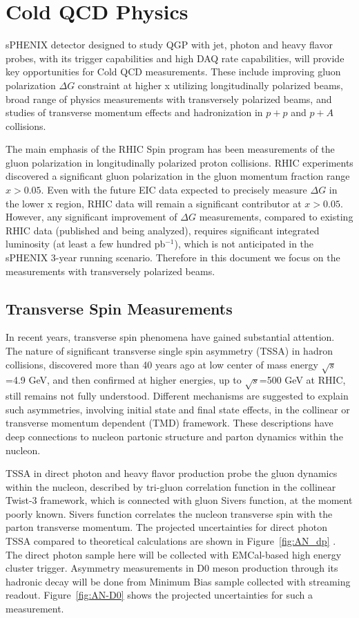 \section{Cold QCD Physics}
\label{sec:ColdQCD}

sPHENIX detector designed to study QGP with jet, photon and heavy flavor probes, with its trigger capabilities and high DAQ rate capabilities, will provide key opportunities for Cold QCD measurements. These include improving gluon polarization $\Delta G$ constraint at higher x utilizing longitudinally polarized beams, broad range of physics measurements with transversely polarized beams, and studies of transverse momentum effects and hadronization in $p+p$ and $p+A$ collisions.

The main emphasis of the RHIC Spin program has been measurements of the gluon polarization in longitudinally polarized proton collisions. RHIC experiments discovered a significant gluon polarization in the gluon momentum fraction range $x>0.05$. Even with the future EIC data expected to precisely measure $\Delta G$ in the lower x region, RHIC data will remain a significant contributor at $x>0.05$. However, any significant improvement of $\Delta G$ measurements, compared to existing RHIC data (published and being analyzed), requires significant integrated luminosity (at least a few hundred pb$^{-1}$), which is not anticipated in the sPHENIX 3-year running scenario. Therefore in this document we focus on the measurements with transversely polarized beams.

\subsection {Transverse Spin Measurements}

In recent years, transverse spin phenomena have gained substantial attention. The nature of significant transverse single spin asymmetry (TSSA) in hadron collisions, discovered more than 40 years ago at low center of mass energy $\sqrt{s}$=4.9 GeV, and then confirmed at higher energies, up to $\sqrt{s}$=500 GeV at RHIC, still remains not fully understood. Different mechanisms are suggested to explain such asymmetries, involving initial state and final state effects, in the collinear or transverse momentum dependent (TMD) framework. These descriptions have deep connections to nucleon partonic structure and parton dynamics within the nucleon.

TSSA in direct photon and heavy flavor production probe the gluon dynamics within the nucleon, described by tri-gluon correlation function in the collinear Twist-3 framework, which is connected with gluon Sivers function, at the moment poorly known. Sivers function correlates the nucleon transverse spin with the parton transverse
momentum. The projected uncertainties for direct photon TSSA compared to theoretical calculations are shown in Figure~\ref{fig:AN_dp} . The direct photon sample here will be collected with EMCal-based high energy cluster trigger. Asymmetry measurements in D0 meson production through its hadronic decay will be done from Minimum Bias sample collected with streaming readout. Figure~\ref{fig:AN-D0} shows the projected uncertainties for such a measurement.

